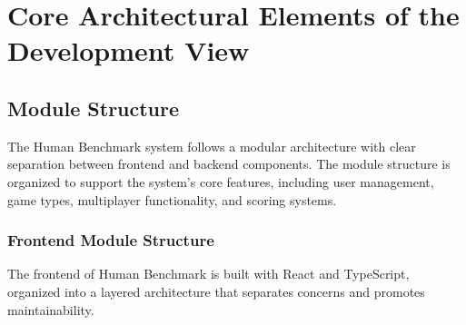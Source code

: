 \section{Core Architectural Elements of the Development View}

\subsection{Module Structure}

The Human Benchmark system follows a modular architecture with clear separation between frontend and backend components. 
The module structure is organized to support the system's core features, including user management, game types, multiplayer functionality, and scoring systems.

\subsubsection{Frontend Module Structure}

The frontend of Human Benchmark is built with React and TypeScript, organized into a layered architecture that separates concerns and promotes maintainability.

    
    
